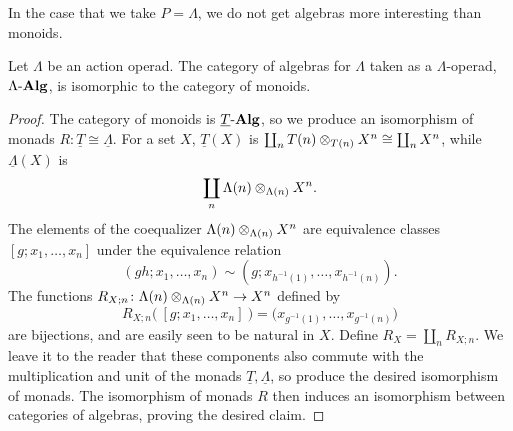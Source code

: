 In the case that we take $P = \Lambda$, we do not get algebras more interesting than monoids.
\begin{prop}\label{prop:Lalg=monoid}
Let $\Lambda$ be an action operad. The category of algebras for $\Lambda$ taken as a $\Lambda$-operad, $\Lambda\mbox{-}\mb{Alg}$, is isomorphic to the category of monoids.
\end{prop}
\begin{proof}
The category of monoids is $\underline{T}\mbox{-}\mb{Alg}$, so we produce an isomorphism of monads $R \colon \underline{T} \cong \underline{\Lambda}$.
For a set $X$, $\underline{T}(X)$ is $\coprod_n \coeq{T}{X}{T}{n} \cong \coprod_n X^n$, while $\underline{\Lambda}(X)$ is
\[
\coprod_n \coeq{\Lambda}{X}{\Lambda}{n}.
\]
The elements of the coequalizer $\coeq{\Lambda}{X}{\Lambda}{n}$ are equivalence classes $[g; x_1, \ldots, x_n]$ under the equivalence relation
	\[
		(gh; x_1, \ldots, x_n) \sim \left(g; x_{h^{-1}(1)}, \ldots, x_{h^{-1}(n)}\right).
	\]
The functions $R_{X;n} \colon \coeq{\Lambda}{X}{\Lambda}{n} \to X^n$ defined by
\[
R_{X;n}\big( \ [g; x_1, \ldots, x_n] \ \big) = \big( x_{g^{-1}(1)}, \ldots, x_{g^{-1}(n)}\big)
\]
are bijections, and are easily seen to be natural in $X$. 
Define $R_X = \coprod_n R_{X;n}$.
We leave it to the reader that these components also commute with the multiplication and unit of the monads $\underline{T}, \underline{\Lambda}$, so produce the desired isomorphism of monads.
The isomorphism of monads $R$ then induces an isomorphism between categories of algebras, proving the desired claim.
%
%
\end{proof}





